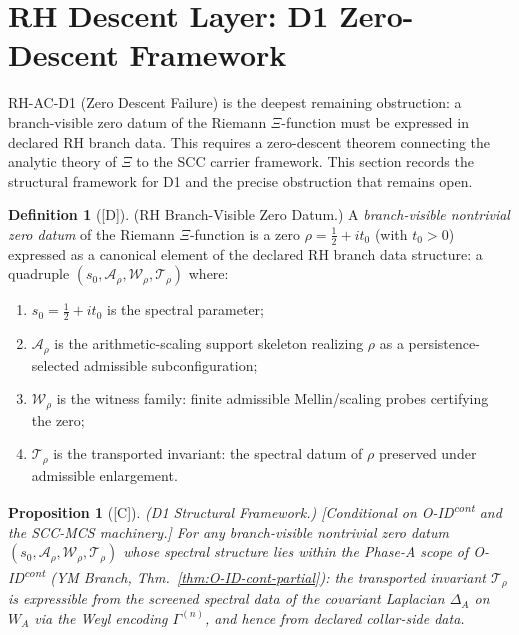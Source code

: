 \documentclass[12pt,oneside]{amsbook}
\theoremstyle{plain}
\newtheorem{proposition}[theorem]{Proposition}
\theoremstyle{definition}
\newtheorem{definition}[theorem]{Definition}
\theoremstyle{remark}
\newcommand{\status}[1]{\textup{[#1]}}
\begin{document}
\section{RH Descent Layer: D1 Zero-Descent Framework}
\label{sec:rh-d1}

RH-AC-D1 (Zero Descent Failure) is the deepest remaining
obstruction: a branch-visible zero datum of the Riemann
$\Xi$-function must be expressed in declared RH branch data.
This requires a zero-descent theorem connecting the analytic
theory of $\Xi$ to the SCC carrier framework. This section
records the structural framework for D1 and the precise
obstruction that remains open.

\begin{definition}[\status{D}]\label{def:rh-zero-datum}
\textup{(RH Branch-Visible Zero Datum.)}
A \emph{branch-visible nontrivial zero datum} of the Riemann
$\Xi$-function is a zero $\rho = \frac{1}{2} + it_0$ (with
$t_0 > 0$) expressed as a canonical element of the declared RH
branch data structure: a quadruple
$(s_0, \mathcal{A}_\rho, \mathcal{W}_\rho, \mathcal{T}_\rho)$
where:
\begin{enumerate}[label=\textup{(\arabic*)}]
 \item $s_0 = \frac{1}{2} + it_0$ is the spectral parameter;
 \item $\mathcal{A}_\rho$ is the arithmetic-scaling support
 skeleton realizing $\rho$ as a persistence-selected
 admissible subconfiguration;
 \item $\mathcal{W}_\rho$ is the witness family: finite
 admissible Mellin/scaling probes certifying the zero;
 \item $\mathcal{T}_\rho$ is the transported invariant:
 the spectral datum of $\rho$ preserved under admissible
 enlargement.
\end{enumerate}
\end{definition}

\begin{proposition}[\status{C}]\label{prop:rh-d1-structure}
\textup{(D1 Structural Framework.)}
\textup{[Conditional on O-ID\textsuperscript{cont} and the
SCC-MCS machinery.]}
For any branch-visible nontrivial zero datum
$(s_0, \mathcal{A}_\rho, \mathcal{W}_\rho, \mathcal{T}_\rho)$
whose spectral structure lies within the Phase-A scope of
O-ID\textsuperscript{cont} (YM Branch, Thm.~\ref{thm:O-ID-cont-partial}):
the transported invariant $\mathcal{T}_\rho$ is expressible from
the screened spectral data of the covariant Laplacian $\Delta_A$
on $W_A$ via the Weyl encoding $\Gamma^{(n)}$, and hence from
declared collar-side data.
\end{proposition}
\end{document}

